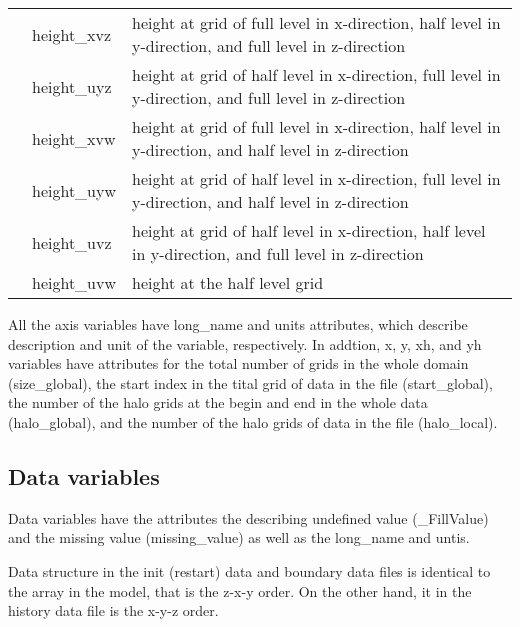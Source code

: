\begin{longtable}{|l|ll|}
    & height\_xvz & height at grid of full level in x-direction, half level in y-direction, and full level in z-direction \\
    & height\_uyz & height at grid of half level in x-direction, full level in y-direction, and full level in z-direction \\
    & height\_xvw & height at grid of full level in x-direction, half level in y-direction, and half level in z-direction \\
    & height\_uyw & height at grid of half level in x-direction, full level in y-direction, and half level in z-direction \\
    & height\_uvz & height at grid of half level in x-direction, half level in y-direction, and full level in z-direction \\
    & height\_uvw & height at the half level grid \\
\end{longtable}

All the axis variables have long\_name and units attributes, which describe description and unit of the variable, respectively.
In addtion, x, y, xh, and yh variables have attributes for the total number of grids in the whole domain (size\_global), the start index in the tital grid of data in the file (start\_global), the number of the halo grids at the begin and end in the whole data (halo\_global), and the number of the halo grids of data in the file (halo\_local).



\subsection{Data variables}
Data variables have the attributes the describing undefined value (\_FillValue) and the missing value (missing\_value) as well as the long\_name and untis.

Data structure in the init (restart) data and boundary data files is identical to the array in the model, that is the z-x-y order.
On the other hand, it in the history data file is the x-y-z order.

